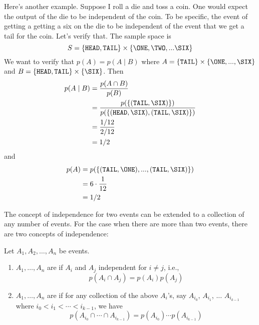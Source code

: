 Here's another example.
Suppose I roll a die and toss a coin.
One would expect the output of the die to be independent of the coin.
To be specific, the event of getting a getting a six on the die
to be independent of the event that we get a tail for the coin.
Let's verify that.
The sample space is
\[
S = \{ \HEAD, \TAIL \} \times \{\ONE, \TWO, ... \SIX \}
\]
We want to verify that $p(A) = p(A \mid B)$ where
$A = \{\TAIL\} \times \{\ONE, ..., \SIX\}$
and
$B = \{\HEAD, \TAIL\} \times \{\SIX\}$.
Then
\begin{align*}
  p(A \mid B)
  &= \frac{p(A \cap B)}{p(B)} \\
  &= \frac{p(\{(\TAIL, \SIX)\})}{p(\{(\HEAD,\SIX),(\TAIL,\SIX)\})} \\
  &= \frac{1/12}{2/12} \\
  &= 1/2
\end{align*}
and
\begin{align*}
  p(A)
  &= p(\{(\TAIL, \ONE), ..., (\TAIL, \SIX)\}) \\
  &= 6 \cdot \frac{1}{12} \\
  &= 1/2
\end{align*}




The concept of independence for two events can be extended to
a collection of any number of events.
For the case when there are more than two events,
there are two concepts of independence:

\begin{defn}
Let $A_1, A_2, \ldots, A_n$ be events.
\begin{enumerate}
\item $A_1, \ldots, A_n$ are 
 if
$A_i$ and $A_j$
independent for $i \neq j$, i.e.,
\[
p(A_i \cap A_j) = p(A_i) p(A_j)
\]
\item $A_1, \ldots, A_n$ are 
   if
  for any collection of the above $A_i$'s, say
  $A_{i_0}$,
  $A_{i_1}$, ...
  $A_{i_{k-1}}$
  where $i_0 < i_1 < \cdots < i_{k-1}$,
  we have  
  \[
  p(A_{i_0} \cap \cdots \cap A_{i_{k-1}}) = p(A_{i_0}) \cdots p(A_{i_{k-1}})
  \]
\end{enumerate}
\end{defn}
